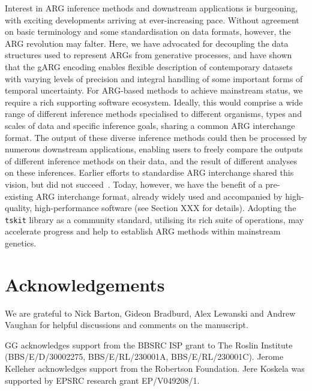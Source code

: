 \documentclass{article}
\begin{document}
Interest in ARG inference methods and downstream applications is
burgeoning, with exciting developments arriving at ever-increasing pace.
Without agreement on basic terminology and some standardisation
on data formats, however, the ARG revolution may falter.
Here, we have advocated
for decoupling the data structures used to represent ARGs
from generative processes, and have shown that the
gARG encoding enables flexible description of
contemporary datasets with varying levels of precision and integral
handling of some important forms of temporal uncertainty.
For ARG-based methods to achieve mainstream status, we require
a rich supporting software ecosystem.
Ideally, this would comprise a wide range of different
inference methods specialised to different organisms, types
and scales of data and
specific inference goals, sharing a common ARG interchange format.
The output of these diverse inference methods could then be
processed by numerous downstream applications,
enabling users to freely compare the outputs of different
inference methods on their data, and the result of different
analyses on these inferences.
Earlier efforts to standardise ARG interchange shared
this vision,
but did not succeed~\citep{cardona2008extended,mcgill2013graphml}.
Today, however, we have the benefit of a pre-existing ARG
interchange format, already widely used and accompanied
by high-quality, high-performance software (see Section XXX for details).
Adopting the \texttt{tskit} library
as a community standard,
utilising its rich suite of operations,
may accelerate progress and help to
establish ARG methods within mainstream genetics.

\section*{Acknowledgements}
We are grateful to Nick Barton, Gideon Bradburd, Alex Lewanski and Andrew Vaughan
for helpful discussions and comments on the manuscript.

GG acknowledges support from the BBSRC ISP grant to The Roslin Institute (BBS/E/D/30002275, BBS/E/RL/230001A, BBS/E/RL/230001C).
Jerome Kelleher acknowledges support from the Robertson Foundation.
Jere Koskela was supported by EPSRC research grant EP/V049208/1.
\end{document}
